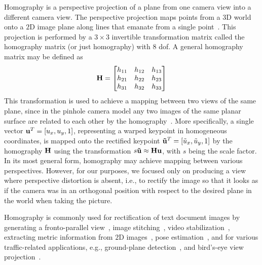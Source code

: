 Homography is a perspective projection of a plane from one camera view into a different camera view. The perspective projection maps points from a $3$D world onto a $2$D image plane along lines that emanate from a single point~\cite{geetha2013automatic, bousaid2020perspective}. This projection is performed by a $3 \times 3$ invertible transformation matrix called the homography matrix (or just homography) with $8$ \gls{dof}. A general homography matrix may be defined as
\begin{equation}
    \label{eq:HomographyMatrix}
    \mathbf{H} =
    \begin{bmatrix}
        h_{11} & h_{12} & h_{13}\\
        h_{21} & h_{22} & h_{23}\\
        h_{31} & h_{32} & h_{33}
    \end{bmatrix}
\end{equation}
This transformation is used to achieve a mapping between two views of the same plane, since in the pinhole camera model any two images of the same planar surface are related to each other by the homography~\cite{hartley2003multiple, hartley1997defense}. More specifically, a single vector ${\mathbf{u}}^T = \left[ {u_x, u_y, 1} \right]$, representing a warped keypoint in homogeneous coordinates, is mapped onto the rectified keypoint  ${\mathbf{\tilde{u}}}^T = \left[ {\tilde{u}_x, \tilde{u}_y, 1} \right]$ by the homography $\mathbf{H}$ using the transformation $s \mathbf{\tilde{u}} \approx \mathbf{H} \mathbf{u}$, with $s$ being the scale factor. In its most general form, homography may achieve mapping between various perspectives. However, for our purposes, we focused only on producing a view where perspective distortion is absent, i.e., to rectify the image so that it looks as if the camera was in an orthogonal position with respect to the desired plane in the world when taking the picture.

Homography is commonly used for rectification of text document images by generating a fronto-parallel view~\cite{lu2005perspective, miao2006perspective}, image stitching~\cite{adel2014image, gao2011constructing}, video stabilization~\cite{liu2015smooth}, extracting metric information from $2$D images~\cite{zhang2000flexible}, pose estimation~\cite{circularmarkerposeestim}, and for various traffic-related applications, e.g., ground-plane detection~\cite{arrospide2010homography}, and bird's-eye view projection~\cite{luo2010low}.

